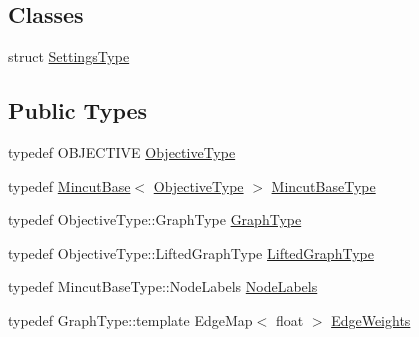 \subsection*{Classes}
\begin{DoxyCompactItemize}
\item 
struct \hyperlink{structnifty_1_1graph_1_1opt_1_1mincut_1_1RandomProposalGenerator_1_1SettingsType}{Settings\+Type}
\end{DoxyCompactItemize}
\subsection*{Public Types}
\begin{DoxyCompactItemize}
\item 
typedef O\+B\+J\+E\+C\+T\+I\+VE \hyperlink{classnifty_1_1graph_1_1opt_1_1mincut_1_1RandomProposalGenerator_af6ef802093e4de20535c753d90f85d89}{Objective\+Type}
\item 
typedef \hyperlink{classnifty_1_1graph_1_1opt_1_1mincut_1_1MincutBase}{Mincut\+Base}$<$ \hyperlink{classnifty_1_1graph_1_1opt_1_1mincut_1_1RandomProposalGenerator_af6ef802093e4de20535c753d90f85d89}{Objective\+Type} $>$ \hyperlink{classnifty_1_1graph_1_1opt_1_1mincut_1_1RandomProposalGenerator_adf35b5667e7c1cc4a507e7df15657415}{Mincut\+Base\+Type}
\item 
typedef Objective\+Type\+::\+Graph\+Type \hyperlink{classnifty_1_1graph_1_1opt_1_1mincut_1_1RandomProposalGenerator_a13dd854d470ea464aa2aa14b08358401}{Graph\+Type}
\item 
typedef Objective\+Type\+::\+Lifted\+Graph\+Type \hyperlink{classnifty_1_1graph_1_1opt_1_1mincut_1_1RandomProposalGenerator_a8c15110181b27dea41d65bc6810ba98a}{Lifted\+Graph\+Type}
\item 
typedef Mincut\+Base\+Type\+::\+Node\+Labels \hyperlink{classnifty_1_1graph_1_1opt_1_1mincut_1_1RandomProposalGenerator_a8c15beb6de4448d7b6c2f8f90682232e}{Node\+Labels}
\item 
typedef Graph\+Type\+::template Edge\+Map$<$ float $>$ \hyperlink{classnifty_1_1graph_1_1opt_1_1mincut_1_1RandomProposalGenerator_ad8eeb72ea540fb03089f90f643d59a96}{Edge\+Weights}
\end{DoxyCompactItemize}
